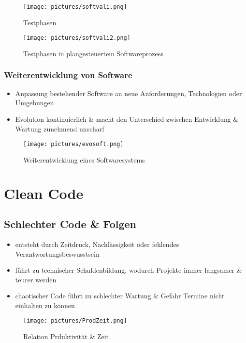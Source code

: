 \documentclass[12pt,a4paper,oneside]{article}
\begin{document}
\begin{figure}[H]
\begin{minipage}[t]{0.5\textwidth}
\centering
\texttt{[image: pictures/softvali.png]}
\caption{Testphasen}
\end{minipage}
\hfill
\begin{minipage}[t]{0.5\textwidth}
\centering
\texttt{[image: pictures/softvali2.png]}
\caption{Testphasen in plangesteuertem Softwareprozess}
\end{minipage}
\end{figure}

\newpage

\subsubsection{Weiterentwicklung von Software}
\begin{itemize}
\item Anpassung bestehender Software an neue Anforderungen, Technologien oder Umgebungen
\item Evolution kontinuierlich \& macht den Unterschied zwischen Entwicklung \& Wartung zunehmend unscharf
\end{itemize}

\begin{figure}[H]
\centering
\texttt{[image: pictures/evosoft.png]}
\caption{Weiterentwicklung eines Softwaresystems}
\end{figure}

\section{Clean Code}

\subsection{Schlechter Code \& Folgen}

\begin{itemize}
\item entsteht durch Zeitdruck,  Nachlässigkeit oder fehlendes Verantwortungsbeswusstsein
\item führt zu technischer Schuldenbildung, wodurch Projekte immer langsamer \& teurer werden
\item chaotischer Code führt zu schlechter Wartung \& Gefahr Termine nicht einhalten zu können
\end{itemize}

\begin{figure}[H]
\centering
\texttt{[image: pictures/ProdZeit.png]}
\caption{Relation Prduktivität \& Zeit}
\end{figure}
\end{document}
